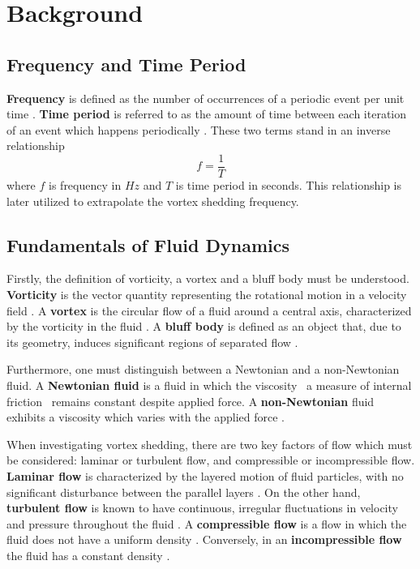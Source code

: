 \section{Background}
\subsection{Frequency and Time Period}
\label{sec:fAndT}
\textbf{Frequency} is defined as the number of occurrences of a periodic event per unit time \parencite[78]{allum2023}. \textbf{Time period} is referred to as the amount of time between each iteration of an event which happens periodically \parencite[78]{allum2023}. These two terms stand in an inverse relationship
\begin{equation}
	f = \frac{1}{T}
	\label{eq:fAndT}
\end{equation}
where $f$ is frequency in $Hz$ and $T$ is time period in seconds. This relationship is later utilized to extrapolate the vortex shedding frequency.
\subsection{Fundamentals of Fluid Dynamics}
Firstly, the definition of vorticity, a vortex and a bluff body must be understood. \textbf{Vorticity} is the vector quantity representing the rotational motion in a velocity field \parencite[p.~2500]{holton2003_vorticity}. A \textbf{vortex} is the circular flow of a fluid around a central axis, characterized by the vorticity in the fluid \parencite[p.~390]{nitsche2006_vortex}. A \textbf{bluff body} is defined as an object that, due to its geometry, induces significant regions of separated flow \parencite[p.~561]{navalhydro1997}. 

Furthermore, one must distinguish between a Newtonian and a non-Newtonian fluid. A \textbf{Newtonian fluid} is a fluid in which the viscosity \textemdash\ a measure of internal friction \textemdash\ remains constant despite applied force. A \textbf{non-Newtonian} fluid exhibits a viscosity which varies with the applied force \parencite{mohn2024}. 

When investigating vortex shedding, there are two key factors of flow which must be considered: laminar or turbulent flow, and compressible or incompressible flow. \textbf{Laminar flow} is characterized by the layered motion of fluid particles, with no significant disturbance between the parallel layers \parencite[pp.~40--41]{versteeg2007}. On the other hand, \textbf{turbulent flow} is known to have continuous, irregular fluctuations in velocity and pressure throughout the fluid \parencite[p.~40]{versteeg2007}. A \textbf{compressible flow} is a flow in which the fluid does not have a uniform density \parencite[p.~31]{oran2002}. Conversely, in an \textbf{incompressible flow} the fluid has a constant density \parencite[p.~12]{versteeg2007}. 

